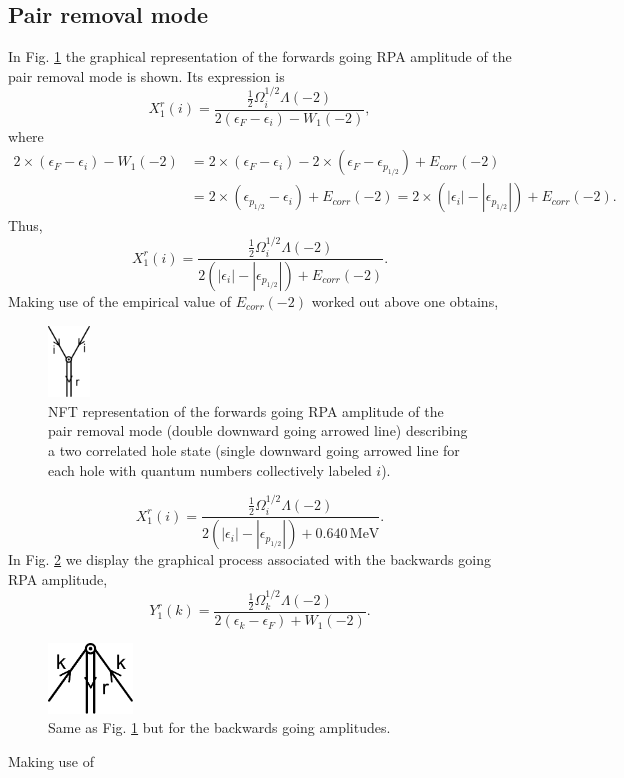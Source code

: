 \subsection{Pair removal mode}
In Fig. \ref{fig1E2} the graphical representation of the forwards going RPA amplitude of the pair removal mode is shown. Its expression is 
\begin{equation*}
X_1^r(i)=\frac{\frac{1}{2}\Omega_i^{1/2}\Lambda(-2)}{2(\epsilon_F-\epsilon_i)-W_1(-2)},
\end{equation*}
where
\begin{equation*}
\begin{split}
2\times(\epsilon_F-\epsilon_i)-W_1(-2)&=2\times(\epsilon_F-\epsilon_i)-2\times(\epsilon_F-\epsilon_{p_{1/2}})+E_{corr}(-2)\\
&=2\times(\epsilon_{p_{1/2}}-\epsilon_i)+E_{corr}(-2)=2\times(|\epsilon_i|-|\epsilon_{p_{1/2}}|)+E_{corr}(-2).
\end{split}
\end{equation*}
Thus,
\begin{equation*}
X_1^r(i)=\frac{\frac{1}{2}\Omega_i^{1/2}\Lambda(-2)}{2(|\epsilon_i|-|\epsilon_{p_{1/2}}|)+E_{corr}(-2)}.
\end{equation*}
Making use of the empirical value of $E_{corr}(-2)$ worked out above one obtains, 
  \begin{figure}
  \centerline{\includegraphics*[width=0.1\textwidth,angle=0]{nutshell/figs/removal_forward.pdf}}
  \caption{NFT representation of the forwards going RPA amplitude of the pair removal mode (double downward going arrowed line) describing a two correlated hole state (single downward going arrowed line for each hole with quantum numbers collectively labeled $i$).}\label{fig1E2}
  \end{figure}
\begin{equation*}
X_1^r(i)=\frac{\frac{1}{2}\Omega_i^{1/2}\Lambda(-2)}{2(|\epsilon_i|-|\epsilon_{p_{1/2}}|)+0.640\,\text{MeV}}.
\end{equation*}
In Fig. \ref{fig1E3} we display the graphical process associated with the backwards going RPA amplitude,
\begin{equation*}
Y_1^r(k)=\frac{\frac{1}{2}\Omega_k^{1/2}\Lambda(-2)}{2(\epsilon_k-\epsilon_F)+W_1(-2)}.
\end{equation*}
  \begin{figure}
  \centerline{\includegraphics*[width=0.2\textwidth,angle=0]{nutshell/figs/removal_backward.pdf}}
  \caption{Same as Fig. \ref{fig1E2} but for the backwards going amplitudes.}\label{fig1E3}
  \end{figure}
  Making use of

